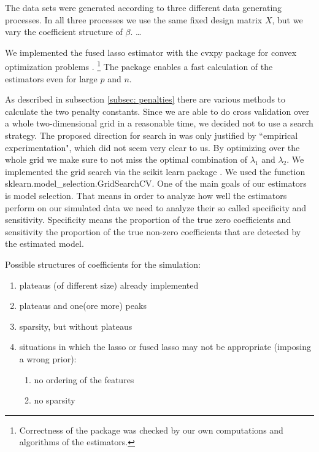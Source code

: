 \documentclass{article}
\theoremstyle{definition}
\begin{document}
The data sets were generated according to three different data generating processes. In all three processes we use the same fixed design matrix $X$, but we vary the coefficient structure of $\beta$. \ldots

We implemented the fused lasso estimator with the cvxpy package for convex optimization problems \citep{cvxpy}. \footnote{Correctness of the package was checked by our own computations and algorithms of the estimators.} The package enables a fast calculation of the estimators even for large $p$ and $n$.

As described in subsection \ref{subsec: penalties} there are various methods to calculate the two penalty constants. Since we are able to do cross validation over a whole two-dimensional grid in a reasonable time, we decided not to use a search strategy. The proposed direction for search in \citep{fused} was only justified by “empirical experimentation", which did not seem very clear to us. By optimizing over the whole grid we make sure to not miss the optimal combination of $\lambda_1$ and $\lambda_2$.
We implemented the grid search via the scikit learn package \citep{scikit-learn}. We used the function sklearn.model\_selection.GridSearchCV.
One of the main goals of our estimators is model selection. That means in order to analyze how well the estimators perform on our simulated data we need to analyze their so called specificity and sensitivity. Specificity means the proportion of the true zero coefficients and sensitivity the proportion of the true non-zero coefficients that are detected by the estimated model.

Possible structures of coefficients for the simulation:
\begin{enumerate}
	\item plateaus (of different size) already implemented
	\item plateaus and one(ore more) peaks
	\item sparsity, but without plateaus
	\item situations in which the lasso or fused lasso may not be appropriate (imposing a wrong prior):
	\begin{enumerate}
		\item no ordering of the features
		\item no sparsity
	\end{enumerate}
\end{enumerate}
\end{document}
